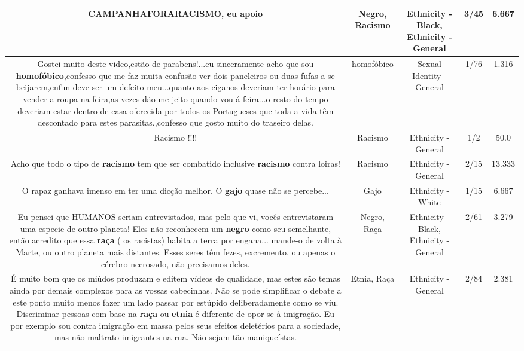 \documentclass[11pt]{article}
\newlength\mylength
\begin{document}
\begin{center}
\begin{longtable}{|C{.65\mylength}|C{.30\mylength}|C{.12\mylength}|C{.12\mylength}|C{.12\mylength}|}
CAMPANHAFORARACISMO, eu apoio\normalsize   & Negro, Racismo & Ethnicity - Black, Ethnicity - General & 3/45 & 6.667 \\  \hline
  \small Gostei muito deste video,estão de parabens!...eu sinceramente acho que sou \textbf{homofóbico},confesso que me faz muita confusão ver dois paneleiros ou duas fufas a se beijarem,enfim deve ser um defeito meu...quanto aos ciganos deveriam ter horário para vender a roupa na feira,as vezes dão-me jeito quando vou á feira...o resto do tempo deveriam estar dentro de casa oferecida por todos os Portugueses que toda a vida têm descontado para estes parasitas.,confesso que gosto muito do traseiro delas.\normalsize   & homofóbico & Sexual Identity - General & 1/76 & 1.316 \\  \hline
  \small Racismo !!!!\normalsize   & Racismo & Ethnicity - General & 1/2 & 50.0 \\  \hline
  \small Acho que todo o tipo de \textbf{racismo} tem que ser combatido inclusive \textbf{racismo} contra loiras!\normalsize   & Racismo & Ethnicity - General & 2/15 & 13.333 \\  \hline
  \small O rapaz ganhava imenso em  ter uma dicção melhor. O \textbf{gajo} quase não se percebe...\normalsize   & Gajo & Ethnicity - White & 1/15 & 6.667 \\  \hline
  \small Eu pensei que HUMANOS seriam entrevistados, mas pelo que vi, vocês entrevistaram uma especie de outro planeta! Eles não reconhecem um \textbf{negro} como seu semelhante, então acredito que essa \textbf{raça} ( os racistas) habita a terra por engana... mande-o de volta  à Marte, ou outro planeta mais distantes. Esses seres têm fezes, excremento, ou apenas o cérebro necrosado, não precisamos deles.\normalsize   & Negro, Raça & Ethnicity - Black, Ethnicity - General & 2/61 & 3.279 \\  \hline
  \small É muito bom que os miúdos produzam e editem vídeos de qualidade, mas estes são temas ainda por demais complexos para as vossas cabecinhas. Não se pode simplificar o debate a este ponto muito menos fazer um lado passar por estúpido deliberadamente como se viu. Discriminar pessoas com base na \textbf{raça} ou \textbf{etnia} é diferente de opor-se à imigração. Eu por exemplo sou contra imigração em massa pelos seus efeitos deletérios para a sociedade, mas não maltrato imigrantes na rua. Não sejam tão maniqueístas.\normalsize   & Etnia, Raça & Ethnicity - General & 2/84 & 2.381 \\  \hline

\end{longtable}
\end{center}
\end{document}
